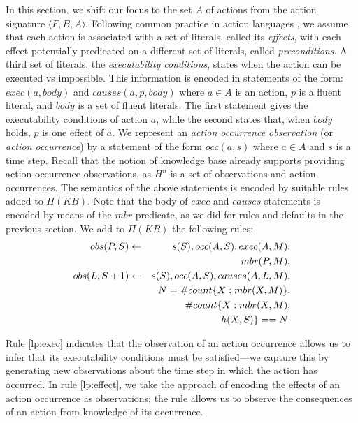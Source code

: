 \documentclass{article}
\begin{document}
In this section, we shift our focus to the set $A$ of actions from the action signature $\langle F, B, A \rangle$. Following common practice in action languages \cite{GelfondL98}, we assume that each action is  associated with a set of literals, called its \emph{effects}, with each effect potentially predicated on a different set of literals, called \emph{preconditions}. A third set of literals, the \emph{executability conditions}, states when the action can be executed vs impossible. This information is encoded in statements of the form: 
$exec(a,body)$ and $causes(a,p,body)$ 
%
where $a \in A$ is an action, $p$ is a fluent literal, and $body$ is a set of fluent literals. 
 The first statement gives the executability conditions of action $a$, while the second states that, when $body$ holds, $p$ is one effect of $a$. We represent an \emph{action occurrence observation} (or {\em action occurrence}) by a statement of the form
 $occ(a,s)$
where $a\in A$ and $s$ is a time step. Recall that the notion of knowledge base already supports providing action occurrence observations, as  $H^{n}$ is a set of observations and action occurrences. The semantics of the above statements is encoded by suitable rules added to $\Pi(KB)$. 
 Note that the body of $exec$ and $causes$ statements is encoded by means of the $mbr$ predicate, as we did for rules and defaults in the previous section. 
We add to $\Pi(KB)$ the following rules:
%
\begin{eqnarray}
obs(P, S)  & \leftarrow & s(S), occ(A, S), exec(A, M), \nonumber    \\
& & mbr(P, M).  \label{lp:exec} \\  
obs(L, S+1) & \leftarrow & s(S),     occ(A, S), causes(A, L, M), \nonumber    \\
& &  N   =\# count \{X : mbr(X, M)\},   \nonumber\\
& & \# count \{X : mbr(X, M),  \nonumber \\ 
&& \hspace*{.4in} h(X, S) \} == N.  \label{lp:effect} 
\end{eqnarray} 

Rule \eqref{lp:exec} indicates that the observation of an action occurrence allows us to infer that its executability conditions must be satisfied---we capture this by generating new observations about the time step in which the action has occurred.
In rule \eqref{lp:effect}, we take the approach of encoding the effects of an action occurrence as observations; the rule allows us to observe the consequences of an action from knowledge of its occurrence.
\end{document}
